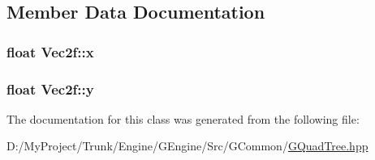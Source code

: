 \subsection{Member Data Documentation}
\hypertarget{class_vec2f_a6d9e939be74a9bce0bd025cffb7cd958}{}
\subsubsection[{x}]{\setlength{\rightskip}{0pt plus 5cm}float Vec2f\+::x}\label{class_vec2f_a6d9e939be74a9bce0bd025cffb7cd958}
\hypertarget{class_vec2f_a0f60c1f16c1e0aceabf46d4a229f9ea9}{}
\subsubsection[{y}]{\setlength{\rightskip}{0pt plus 5cm}float Vec2f\+::y}\label{class_vec2f_a0f60c1f16c1e0aceabf46d4a229f9ea9}


The documentation for this class was generated from the following file\+:\begin{DoxyCompactItemize}
\item 
D\+:/\+My\+Project/\+Trunk/\+Engine/\+G\+Engine/\+Src/\+G\+Common/\hyperlink{_g_quad_tree_8hpp}{G\+Quad\+Tree.\+hpp}\end{DoxyCompactItemize}
